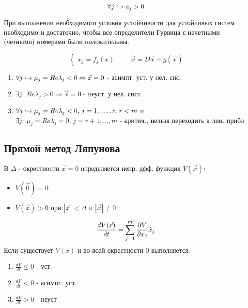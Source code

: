 \documentclass{article}
\begin{document}
\begin{theorem}
  \[
    \forall j \hookrightarrow a_j > 0
  \]
\end{theorem}
\begin{theorem}
  При выполнении необходимого условия устойчивости для устойчивых систем
  необходимо и достаточно, чтобы все определители Гурвица с нечетными (четными)
  номерами были положительны.
\end{theorem}
\begin{theorem}
  \[
    \left\{\begin{aligned}
      \dot{x}_j=f_j(x)
    \end{aligned}\right. \qquad \dot{\vec{x}}=D\vec{x}+g(\vec{x})
  \]
  \begin{enumerate}
    \item $\forall j \hookrightarrow \mu_j=Re \lambda_j<0 \Leftrightarrow \vec{x}=0$ - асимпт. уст. у нел. сис.
    \item $\exists j: \: Re\lambda_j>0 \Rightarrow \vec{x}=0$ - неуст. у нел. сист.
    \item $\forall j \hookrightarrow \mu_j=Re \lambda_j <0, \, j=1,\dots ,r, \, r<m$ и
      $\exists j: \: \mu_j=Re \lambda_j=0, \, j=r+1,\dots ,m$ 
      - критич., нельзя переходить к лин. прибл
  \end{enumerate}
\end{theorem}
\subsection{Прямой метод Ляпунова}
В $\Delta$ - окрестности $\vec{x}=0$ определяется непр. дфф. функция $V(\vec{x})$:
\begin{itemize}
  \item $V(\vec{0})=0$
  \item $V(\vec{x})>0$ при $|\vec{x}|<\Delta$ и $|\vec{x}|\neq 0$
\end{itemize}
\[
  \frac{dV(\vec{x})}{dt}=\sum_{j=1}^{m}\frac{\partial{V}}{\partial{x_j}}\dot{x}_j
\]
Если существует $V(x)$ и во всей окрестности $0$ выполняется:
\begin{enumerate}
  \item $\frac{dV}{dt}\le 0$ - уст.
  \item $\frac{dV}{dt}<0$ - асимпт. уст.
  \item $\frac{dV}{dt}>0$ - неуст
\end{enumerate}
\end{document}
